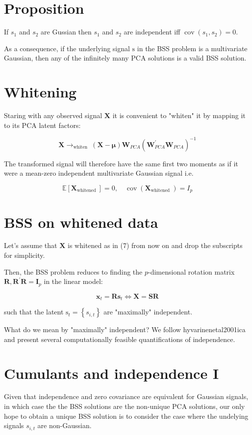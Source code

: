 \documentclass[11pt]{article}
\theoremstyle{plain} %
\theoremstyle{remark}
\begin{document}
\section*{Proposition}
If $s_{1}$ and $s_{2}$ are Gussian then $s_{1}$ and $s_{2}$ are independent iff
$\operatorname{cov}\left(s_{1}, s_{2}\right)=0$.

As a consequence, if the underlying signal $\mathrm{s}$ in the BSS problem is a
multivariate Gaussian, then any of the infinitely many PCA solutions is a valid
BSS solution.

\section*{Whitening}
Staring with any observed signal $\mathbf{X}$ it is convenient to "whiten" it by
mapping it to its PCA latent factors:

$$
\mathbf{X} \rightarrow_{\text {whiten }}(\mathbf{X}-\boldsymbol{\mu}) \mathbf{W}_{P C A}\left(\mathbf{W}_{P C A}^{\prime} \mathbf{W}_{P C A}\right)^{-1}
$$

The transformed signal will therefore have the same first two moments as if it
were a mean-zero independent multivariate Gaussian signal i.e.

$$
\mathbb{E}\left[\mathbf{X}_{\text {whitened }}\right]=0, \quad \operatorname{cov}\left(\mathbf{X}_{\text {whitened }}\right)=I_{p}
$$

\section*{BSS on whitened data}
Let's assume that $\mathbf{X}$ is whitened as in (7) from now on and drop the
subscripts for simplicity.

Then, the BSS problem reduces to finding the $p$-dimensional rotation matrix
$\mathbf{R}, \mathbf{R}^{\prime} \mathbf{R}=\mathbf{I}_{p}$ in the linear model:

$$
\mathbf{x}_{t}=\mathbf{R s}_{t} \Longleftrightarrow \mathbf{X}=\mathbf{S R}
$$

such that the latent $\mathrm{s}_{t}=\left\{s_{i, t}\right\}$ are "maximally"
independent.

What do we mean by "maximally" independent? We follow hyvarinenetal2001ica and
present several computationally feasible quantifications of independence.

\section*{Cumulants and independence I}
Given that independence and zero covariance are equivalent for Gaussian signals,
in which case the the BSS solutions are the non-unique PCA solutions, our only
hope to obtain a unique BSS solution is to consider the case where the undelying
signals $s_{i, t}$ are non-Gaussian.
\end{document}
